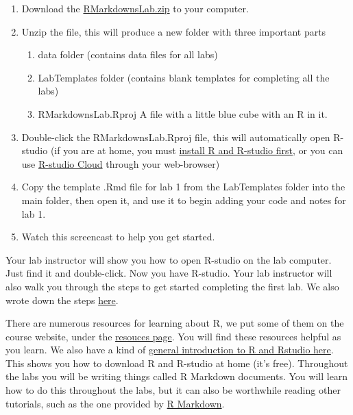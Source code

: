 \documentclass[
]{book}
\providecommand{\tightlist}{%
  \setlength{\itemsep}{0pt}\setlength{\parskip}{0pt}}
\begin{document}
\begin{enumerate}
\def\labelenumi{\arabic{enumi}.}
\tightlist
\item
  Download the \href{https://github.com/CrumpLab/statisticsLab/raw/master/RMarkdownsLab.zip}{RMarkdownsLab.zip} to your computer.
\item
  Unzip the file, this will produce a new folder with three important parts

  \begin{enumerate}
  \def\labelenumii{\alph{enumii}.}
  \tightlist
  \item
    data folder (contains data files for all labs)
  \item
    LabTemplates folder (contains blank templates for completing all the labs)
  \item
    RMarkdownsLab.Rproj A file with a little blue cube with an R in it.
  \end{enumerate}
\item
  Double-click the RMarkdownsLab.Rproj file, this will automatically open R-studio (if you are at home, you must \href{https://crumplab.github.io/statisticsLab/software.html\#installing-r-and-r-studio}{install R and R-studio first}, or you can use \href{https://crumplab.github.io/statisticsLab/software.html\#r-studio-cloud}{R-studio Cloud} through your web-browser)
\item
  Copy the template .Rmd file for lab 1 from the LabTemplates folder into the main folder, then open it, and use it to begin adding your code and notes for lab 1.
\item
  Watch this screencast to help you get started.
\end{enumerate}

Your lab instructor will show you how to open R-studio on the lab computer. Just find it and double-click. Now you have R-studio. Your lab instructor will also walk you through the steps to get started completing the first lab. We also wrote down the steps \href{https://crumplab.github.io/statisticsLab/software.html\#how-to-complete-the-r-labs}{here}.

There are numerous resources for learning about R, we put some of them on the course website, under the \href{https://crumplab.github.io/psyc3400/Resources.html}{resouces page}. You will find these resources helpful as you learn. We also have a kind of \href{https://crumplab.github.io/statisticsLab/software.html\#r}{general introduction to R and Rstudio here}. This shows you how to download R and R-studio at home (it's free). Throughout the labs you will be writing things called R Markdown documents. You will learn how to do this throughout the labs, but it can also be worthwhile reading other tutorials, such as the one provided by \href{https://rmarkdown.rstudio.com/lesson-1.html}{R Markdown}.
\end{document}
